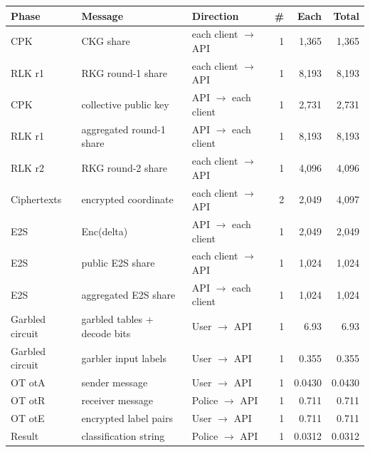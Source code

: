 \begin{tabular}{lllrrr}
\hline
Phase & Message & Direction & \# & Each & Total \\
\hline
CPK & CKG share & each client $\rightarrow$ API & 1 & 1,365 & 1,365 \\
RLK r1 & RKG round-1 share & each client $\rightarrow$ API & 1 & 8,193 & 8,193 \\
CPK & collective public key & API $\rightarrow$ each client & 1 & 2,731 & 2,731 \\
RLK r1 & aggregated round-1 share & API $\rightarrow$ each client & 1 & 8,193 & 8,193 \\
RLK r2 & RKG round-2 share & each client $\rightarrow$ API & 1 & 4,096 & 4,096 \\
Ciphertexts & encrypted coordinate & each client $\rightarrow$ API & 2 & 2,049 & 4,097 \\
E2S & Enc(delta) & API $\rightarrow$ each client & 1 & 2,049 & 2,049 \\
E2S & public E2S share & each client $\rightarrow$ API & 1 & 1,024 & 1,024 \\
E2S & aggregated E2S share & API $\rightarrow$ each client & 1 & 1,024 & 1,024 \\
Garbled circuit & garbled tables + decode bits & User $\rightarrow$ API & 1 & 6.93 & 6.93 \\
Garbled circuit & garbler input labels & User $\rightarrow$ API & 1 & 0.355 & 0.355 \\
OT otA & sender message & User $\rightarrow$ API & 1 & 0.0430 & 0.0430 \\
OT otR & receiver message & Police $\rightarrow$ API & 1 & 0.711 & 0.711 \\
OT otE & encrypted label pairs & User $\rightarrow$ API & 1 & 0.711 & 0.711 \\
Result & classification string & Police $\rightarrow$ API & 1 & 0.0312 & 0.0312 \\
\hline
\end{tabular}
